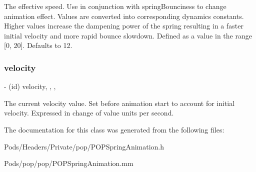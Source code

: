 The effective speed.  Use in conjunction with \textquotesingle{}spring\+Bounciness\textquotesingle{} to change animation effect. Values are converted into corresponding dynamics constants. Higher values increase the dampening power of the spring resulting in a faster initial velocity and more rapid bounce slowdown. Defined as a value in the range \mbox{[}0, 20\mbox{]}. Defaults to 12. \mbox{\label{interface_p_o_p_spring_animation_ad413eacea836237501a69880c6e85906}} 
\subsubsection{\texorpdfstring{velocity}{velocity}}
{\footnotesize\ttfamily -\/ (id) velocity\hspace{0.3cm}{\ttfamily [read]}, {\ttfamily [write]}, {\ttfamily [nonatomic]}, {\ttfamily [copy]}}

The current velocity value.  Set before animation start to account for initial velocity. Expressed in change of value units per second. 

The documentation for this class was generated from the following files\+:\begin{DoxyCompactItemize}
\item 
Pods/\+Headers/\+Private/pop/P\+O\+P\+Spring\+Animation.\+h\item 
Pods/pop/pop/P\+O\+P\+Spring\+Animation.\+mm\end{DoxyCompactItemize}
